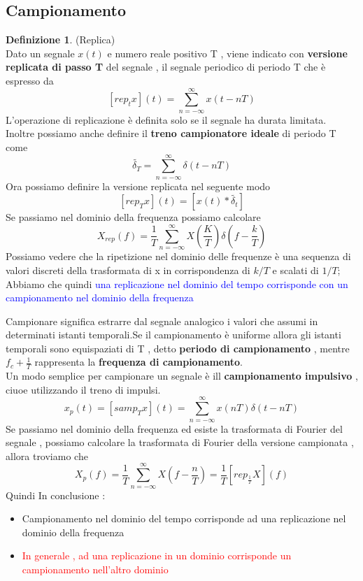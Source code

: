 \documentclass{article}
\theoremstyle{definition}
\newtheorem*{definizione}{Definizione}
\newcommand{\suminf}{\sum_{n=-\infty}^{\infty}}
\begin{document}
	\subsection{Campionamento}
	\begin{definizione}(Replica)\\
		Dato un segnale $x(t)$ e numero reale positivo T , viene indicato con \textbf{versione replicata di passo T} del segnale , il segnale periodico di periodo T che è espresso da 
		$$[rep_tx](t)=\sum_{n=-\infty}^{\infty}x(t-nT)$$
		L'operazione di replicazione è definita solo se il segnale ha durata limitata.\\
		Inoltre possiamo anche definire il \textbf{treno campionatore ideale} di periodo T come 
		$$\widetilde{\delta_T}=\sum_{n=-\infty}^{\infty}\delta(t-nT)$$ 
		Ora possiamo definire la versione replicata nel seguente modo 
		$$[rep_Tx](t)=[x(t)*\widetilde{\delta_t}]$$
		Se passiamo nel dominio della frequenza possiamo calcolare $$X_{rep}(f)=\frac{1}{T}\suminf X\left(\frac{K}{T}\right)\delta\left(f-\frac{k}{T}\right)$$
		Possiamo vedere che la ripetizione nel dominio delle frequenze è una sequenza di valori discreti della trasformata di x in corrispondenza di $k/T$ e scalati di $1/T$;
		Abbiamo che quindi \textcolor{blue}{una replicazione nel dominio del tempo corrisponde con un campionamento nel dominio della frequenza}
	\end{definizione}
	Campionare significa estrarre dal segnale analogico i valori che assumi in determinati istanti temporali.Se il campionamento è uniforme allora gli istanti temporali sono equispaziati di T , detto \textbf{periodo di campionamento} , mentre $f_c+\frac{1}{T}$ rappresenta la \textbf{frequenza di campionamento}.\\
	Un modo semplice per campionare un segnale è ill \textbf{campionamento impulsivo} , ciuoe utilizzando il treno di impulsi. 
	$$x_p(t)=[samp_Tx](t)=\suminf x(nT)\delta(t-nT)$$
	Se passiamo nel dominio della frequenza ed esiste la trasformata di Fourier del segnale , possiamo calcolare la trasformata di Fourier della versione campionata , allora troviamo che 
	$$X_p(f)=\frac{1}{T}\suminf X(f-\frac{n}{T})=\frac{1}{T}[rep_{\frac{1}{T}}X](f)$$
Quindi In conclusione : 
\begin{itemize}
	\item Campionamento nel dominio del tempo corrisponde ad una replicazione nel dominio della frequenza 
	\item\textcolor{red}{ In generale , ad una replicazione in un dominio corrisponde un campionamento nell'altro dominio}
\end{itemize}
\end{document}
